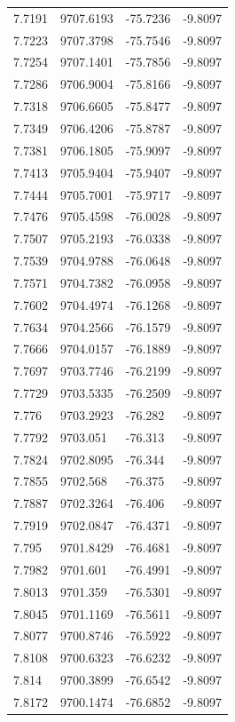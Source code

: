 \begin{table}[H]
\begin{tabular}{llll}
7.7191 & 9707.6193 & -75.7236 & -9.8097 \\
7.7223 & 9707.3798 & -75.7546 & -9.8097 \\
7.7254 & 9707.1401 & -75.7856 & -9.8097 \\
7.7286 & 9706.9004 & -75.8166 & -9.8097 \\
7.7318 & 9706.6605 & -75.8477 & -9.8097 \\
7.7349 & 9706.4206 & -75.8787 & -9.8097 \\
7.7381 & 9706.1805 & -75.9097 & -9.8097 \\
7.7413 & 9705.9404 & -75.9407 & -9.8097 \\
7.7444 & 9705.7001 & -75.9717 & -9.8097 \\
7.7476 & 9705.4598 & -76.0028 & -9.8097 \\
7.7507 & 9705.2193 & -76.0338 & -9.8097 \\
7.7539 & 9704.9788 & -76.0648 & -9.8097 \\
7.7571 & 9704.7382 & -76.0958 & -9.8097 \\
7.7602 & 9704.4974 & -76.1268 & -9.8097 \\
7.7634 & 9704.2566 & -76.1579 & -9.8097 \\
7.7666 & 9704.0157 & -76.1889 & -9.8097 \\
7.7697 & 9703.7746 & -76.2199 & -9.8097 \\
7.7729 & 9703.5335 & -76.2509 & -9.8097 \\
7.776 & 9703.2923 & -76.282 & -9.8097 \\
7.7792 & 9703.051 & -76.313 & -9.8097 \\
7.7824 & 9702.8095 & -76.344 & -9.8097 \\
7.7855 & 9702.568 & -76.375 & -9.8097 \\
7.7887 & 9702.3264 & -76.406 & -9.8097 \\
7.7919 & 9702.0847 & -76.4371 & -9.8097 \\
7.795 & 9701.8429 & -76.4681 & -9.8097 \\
7.7982 & 9701.601 & -76.4991 & -9.8097 \\
7.8013 & 9701.359 & -76.5301 & -9.8097 \\
7.8045 & 9701.1169 & -76.5611 & -9.8097 \\
7.8077 & 9700.8746 & -76.5922 & -9.8097 \\
7.8108 & 9700.6323 & -76.6232 & -9.8097 \\
7.814 & 9700.3899 & -76.6542 & -9.8097 \\
7.8172 & 9700.1474 & -76.6852 & -9.8097 \\

\end{tabular}
\end{table}
